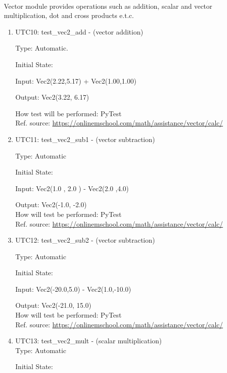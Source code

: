 \documentclass[12pt, titlepage]{article}
\begin{document}
\paragraph{}
Vector module provides operations such as addition, scalar and vector multiplication, dot and cross products e.t.c.
\begin{enumerate}
	
\item{UTC10}{: test\_vec2\_add - (vector addition) \\}
	
	Type: Automatic.
	
	Initial State: 
	
	Input: Vec2(2.22,5.17) + Vec2(1.00,1.00)
	
	Output: Vec2(3.22, 6.17)
	
	How test will be performed: PyTest \\
	Ref. source: \url{https://onlinemschool.com/math/assistance/vector/calc/}
	
    \item{UTC11}{: test\_vec2\_sub1 - (vector subtraction)\\}
	
	Type: Automatic
	
	Initial State: 
	
	Input: Vec2(1.0 , 2.0 ) - Vec2(2.0 ,4.0)
	
	Output: Vec2(-1.0, -2.0)\\
	How will test be performed: PyTest\\
	Ref. source: \url{https://onlinemschool.com/math/assistance/vector/calc/}
	
    \item{UTC12}{: test\_vec2\_sub2 - (vector subtraction)\\}
	
	Type: Automatic
	
	Initial State: 
	
	Input: Vec2(-20.0,5.0) - Vec2(1.0,-10.0)
	
	Output: Vec2(-21.0, 15.0)\\
	How will test be performed: PyTest\\
	Ref. source: \url{https://onlinemschool.com/math/assistance/vector/calc/}
	
	\item{UTC13}{: test\_vec2\_mult} - (scalar multiplication)\\
	
	Type: Automatic
	
	Initial State: 
	

\end{enumerate}
\end{document}

